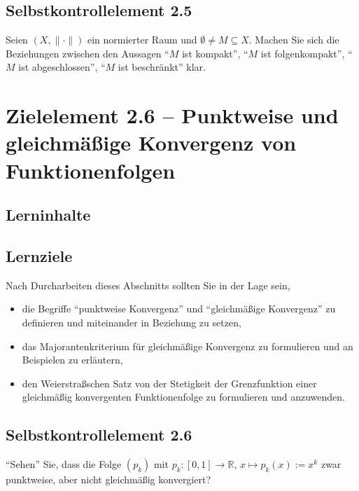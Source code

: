\documentclass[a4paper,12pt]{article}
\begin{document}
\subsection*{Selbstkontrollelement 2.5}

Seien $(X, \|\cdot\|)$ ein normierter Raum und $\emptyset \neq M \subseteq X$.
Machen Sie sich die Beziehungen zwischen den Aussagen "`$M$ ist kompakt"',
"`$M$ ist folgenkompakt"', "`$M$ ist abgeschlossen"', "`$M$ ist beschränkt"' klar.

\newpage

\section*{Zielelement 2.6 -- Punktweise und gleichmäßige Konvergenz von Funktionenfolgen}

\subsection*{Lerninhalte}

\begin{center}
\end{center}

\subsection*{Lernziele}

Nach Durcharbeiten dieses Abschnitts sollten Sie in der Lage sein,
\begin{itemize}
  \item die Begriffe "`punktweise Konvergenz"' und "`gleichmäßige Konvergenz"' zu
        definieren und miteinander in Beziehung zu setzen,
  \item das Majorantenkriterium für gleichmäßige Konvergenz zu formulieren und an
        Beispielen zu erläutern,
  \item den Weierstraßschen Satz von der Stetigkeit der Grenzfunktion einer
        gleichmäßig konvergenten Funktionenfolge zu formulieren und anzuwenden.
\end{itemize}

\subsection*{Selbstkontrollelement 2.6}

"`Sehen"' Sie, dass die Folge $(p_k)$ mit $p_k : [0,1] \to \mathbb{R}$,
$x \mapsto p_k(x) := x^k$ zwar punktweise, aber nicht gleichmäßig konvergiert?
\end{document}
